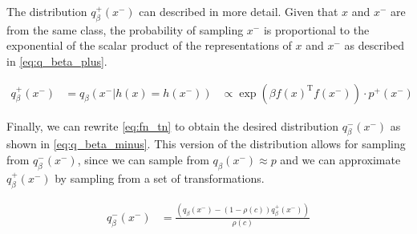 The distribution $q^{+}_\beta(x^-)$ can described in more detail.
Given that $x$ and $x^-$ are from the same class, 
the probability of sampling $x^-$ is proportional to the exponential of the scalar product of the 
representations of $x$ and $x^-$ as described in \eqref{eq:q_beta_plus}.

\begin{align}
    q^{+}_\beta(x^-) &= q_\beta(x^-|h(x) = h(x^-)) &\propto \exp(\beta f(x)^\text{T}f(x^-))\cdot p^+(x^-) 
    \label{eq:q_beta_plus}
\end{align}

Finally, we can rewrite \eqref{eq:fn_tn} to obtain the desired distribution $q^-_{\beta}(x^-)$ as shown in \eqref{eq:q_beta_minus}.
This version of the distribution allows for sampling from $q^-_{\beta}(x^-)$, since we can sample from $q_\beta(x^-) \approx p$ 
and we can approximate $q^{+}_\beta(x^-)$ by sampling from a set of transformations.    %

\begin{align}
    q^{-}_\beta(x^-) &= \frac{(q_\beta(x^-)-(1-\rho(c))q^{+}_\beta(x^-))}{\rho(c)} 
    \label{eq:q_beta_minus}
\end{align}



